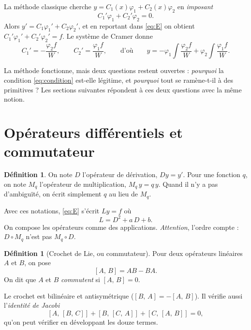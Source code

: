 \documentclass[11pt,a4paper]{article}
\theoremstyle{plain}
\theoremstyle{definition}
\newtheorem{definition}[theoreme]{Définition}
\theoremstyle{remark}
\newcommand{\Dx}{D}
\newcommand{\M}[1]{M_{#1}}
\newcommand{\cro}[2]{\left[#1,\,#2\right]}
\begin{document}
La méthode classique cherche $y = C_1(x)\varphi_1 + C_2(x)\varphi_2$ en \emph{imposant}
\begin{equation}\label{eq:condition}
  C_1'\varphi_1 + C_2'\varphi_2 = 0 .
\end{equation}
Alors $y' = C_1\varphi_1' + C_2\varphi_2'$, et en reportant dans \eqref{eq:E} on obtient $C_1'\varphi_1' + C_2'\varphi_2' = f$. Le système de Cramer donne
\begin{equation}\label{eq:vdc}
  C_1' = -\frac{\varphi_2 f}{W}, \qquad C_2' = \frac{\varphi_1 f}{W},
  \qquad\text{d'où}\qquad
  y = -\varphi_1\!\int\!\frac{\varphi_2 f}{W} + \varphi_2\!\int\!\frac{\varphi_1 f}{W}.
\end{equation}

La méthode fonctionne, mais deux questions restent ouvertes : \emph{pourquoi} la condition \eqref{eq:condition} est-elle légitime, et \emph{pourquoi} tout se ramène-t-il à des primitives ? Les sections suivantes répondent à ces deux questions avec la même notion.

\section{Opérateurs différentiels et commutateur}

\begin{definition}
On note $\Dx$ l'opérateur de dérivation, $\Dx y = y'$. Pour une fonction $q$, on note $\M{q}$ l'opérateur de multiplication, $\M{q}\,y = q\,y$. Quand il n'y a pas d'ambiguïté, on écrit simplement $q$ au lieu de $\M{q}$.
\end{definition}

Avec ces notations, \eqref{eq:E} s'écrit $Ly = f$ où
\[
  L = \Dx^2 + a\,\Dx + b .
\]
On compose les opérateurs comme des applications. \emph{Attention}, l'ordre compte : $\Dx\circ\M{q}$ n'est pas $\M{q}\circ\Dx$.

\begin{definition}[Crochet de Lie, ou commutateur]
Pour deux opérateurs linéaires $A$ et $B$, on pose
\[
  \cro{A}{B} = AB - BA .
\]
On dit que $A$ et $B$ \emph{commutent} si $\cro{A}{B}=0$.
\end{definition}

Le crochet est bilinéaire et antisymétrique ($\cro{B}{A}=-\cro{A}{B}$). Il vérifie aussi l'\emph{identité de Jacobi}
\[
  \cro{A}{\cro{B}{C}} + \cro{B}{\cro{C}{A}} + \cro{C}{\cro{A}{B}} = 0,
\]
qu'on peut vérifier en développant les douze termes.
\end{document}

